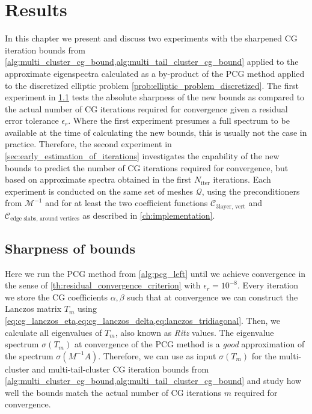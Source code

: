 \chapter{Results}\label{ch:results}
In this chapter we present and discuss two experiments with the sharpened CG iteration bounds from \cref{alg:multi_cluster_cg_bound,alg:multi_tail_cluster_cg_bound} applied to the approximate eigenspectra calculated as a by-product of the PCG method applied to the discretized elliptic problem \cref{prob:elliptic_problem_discretized}. The first experiment in \cref{sec:sharpness_of_bounds} tests the absolute sharpness of the new bounds as compared to the actual number of CG iterations required for convergence given a residual error tolerance $\epsilon_r$. Where the first experiment presumes a full spectrum to be available at the time of calculating the new bounds, this is usually not the case in practice. Therefore, the second experiment in \cref{sec:early_estimation_of_iterations} investigates the capability of the new bounds to predict the number of CG iterations required for convergence, but based on approximate spectra obtained in the first $N_{\text{iter}}$ iterations. Each experiment is conducted on the same set of meshes $\mathcal{Q}$, using the preconditioners from $\mathcal{M}^{-1}$ and for at least the two coefficient functions $\mathcal{C}_{\text{3layer, vert}}$ and $\mathcal{C}_{\text{edge slabs, around vertices}}$ as described in \cref{ch:implementation}. 

\section{Sharpness of bounds}\label{sec:sharpness_of_bounds}
Here we run the PCG method from \cref{alg:pcg_left} until we achieve convergence in the sense of \cref{th:residual_convergence_criterion} with $\epsilon_r=10^{-8}$. Every iteration we store the CG coefficients $\alpha,\beta$ such that at convergence we can construct the Lanczos matrix $T_m$ using \cref{eq:cg_lanczos_eta,eq:cg_lanczos_delta,eq:lanczos_tridiagonal}. Then, we calculate all eigenvalues of $T_m$, also known as \textit{Ritz} values. The eigenvalue spectrum $\sigma(T_m)$ at convergence of the PCG method is a \textit{good} approximation of the spectrum $\sigma(M^{-1}A)$. Therefore, we can use as input $\sigma(T_m)$ for the multi-cluster and multi-tail-cluster CG iteration bounds from \cref{alg:multi_cluster_cg_bound,alg:multi_tail_cluster_cg_bound} and study how well the bounds match the actual number of CG iterations $m$ required for convergence. 

